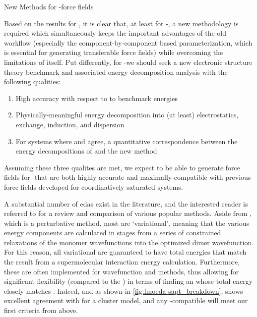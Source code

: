 \begin{section}{New Methods for \cus-\mof force fields}
\label{sec:lmoeda-theory}

Based on the results for \mgmof, it is clear that, at least for \cus-\mofs, a
new methodology is required which simultaneously keeps the important advantages of the
old workflow (especially the component-by-component based parameterization,
which is essential for generating transferable force fields) while overcoming
the limitations of \sapt itself. Put differently, for \cus-\mofs we should
seek a new electronic structure theory benchmark and associated energy
decomposition analysis with the following qualities:
%
\begin{enumerate}
\item High accuracy with respect to to \ccsdtf benchmark energies
\item Physically-meaningful energy decomposition into (at least)
electrostatics, exchange, induction, and dispersion
\item For systems where \sapt and \ccsdtf agree, a quantitative correspondence
between the energy decompositions of \sapt and the new method
\end{enumerate}
%
Assuming these three qualites are met, we expect to be able to generate force
fields for \cus-\mofs that are both highly accurate and maximally-compatible
with previous force fields developed for coordinatively-saturated \mof
systems. 

A substantial number of \glspl{eda} exist in the literature,
and the interested reader is referred to  for a
review and comparison of various popular methods. Aside from \sapt, which is a
perturbative method, most \edas are `variational', meaning that the
various energy components are calculated in stages from a series of constrained
relaxations of the monomer wavefunctions into the optimized
dimer wavefunction. For this reason, all variational \edas
are guaranteed to have total energies that match the result from a supermolecular
interaction energy calculation. Furthermore, these \edas are often implemented
for wavefunction and \dft methods, thus allowing for significant
flexibility (compared to the \sapt \eda) in terms of finding an \eda whose
total energy closely matches \ccsdtf. Indeed, and 
as shown in
\cref{fig:lmoeda-sapt_breakdown}, \pbeod
shows excellent agreement with \ccsdtf for a \mgmof cluster model, 
and any \dft-compatible \eda will meet our first criteria from above.


\end{section}
